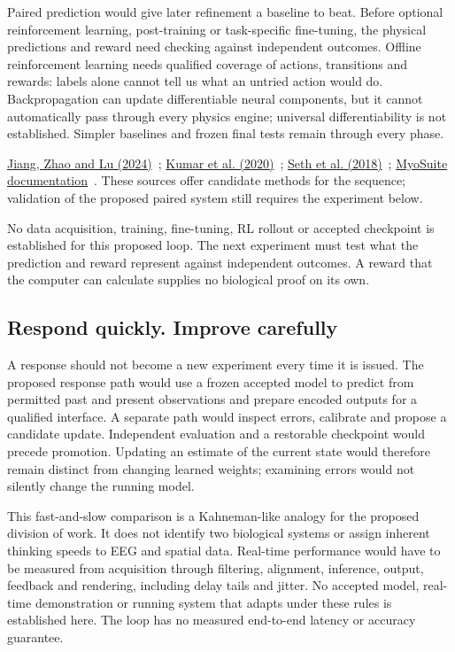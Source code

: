 Paired prediction would give later refinement a baseline to beat. Before
optional reinforcement learning, post-training or task-specific fine-tuning,
the physical predictions and reward need checking against independent
outcomes. Offline reinforcement learning needs qualified coverage of actions,
transitions and rewards: labels alone cannot tell us what an untried action
would do. Backpropagation can update differentiable neural components, but
it cannot automatically pass through every physics engine; universal
differentiability is not established. Simpler baselines and frozen final
tests remain through every phase.
\par\noindent \href{https://arxiv.org/html/2405.18765v1}{Jiang, Zhao and Lu (2024)}~\cite{labram2024}; \href{https://arxiv.org/abs/2006.04779v3}{Kumar et al. (2020)}~\cite{cql2020}; \href{https://journals.plos.org/ploscompbiol/article?id=10.1371/journal.pcbi.1006223}{Seth et al. (2018)}~\cite{opensim2018}; \href{https://myosuite.readthedocs.io/en/latest/}{MyoSuite documentation}~\cite{myosuiteDocsUndated}. These sources offer candidate methods for the sequence; validation of the proposed paired system still requires the experiment below.

No data acquisition, training, fine-tuning, RL rollout or accepted checkpoint
is established for this proposed loop. The next experiment must test what
the prediction and reward represent against independent outcomes. A reward
that the computer can calculate supplies no biological proof on its own.

\subsection{Respond quickly. Improve carefully}
A response should not become a new experiment every time it is issued.
The proposed response path would use a frozen accepted model to predict from
permitted past and present observations and prepare encoded outputs for a
qualified interface. A separate path would inspect errors, calibrate and
propose a candidate update. Independent evaluation and a restorable checkpoint
would precede promotion. Updating an estimate of the current state would
therefore remain distinct from changing learned weights; examining errors
would not silently change the running model.

This fast-and-slow comparison is a Kahneman-like analogy for the proposed division of work. It does not identify two biological systems or assign inherent thinking speeds to EEG and spatial data. Real-time performance would have to be measured from acquisition through filtering, alignment, inference, output, feedback and rendering, including delay tails and jitter. No accepted model, real-time demonstration or running system that adapts under these rules is established here. The loop has no measured end-to-end latency or accuracy guarantee.

